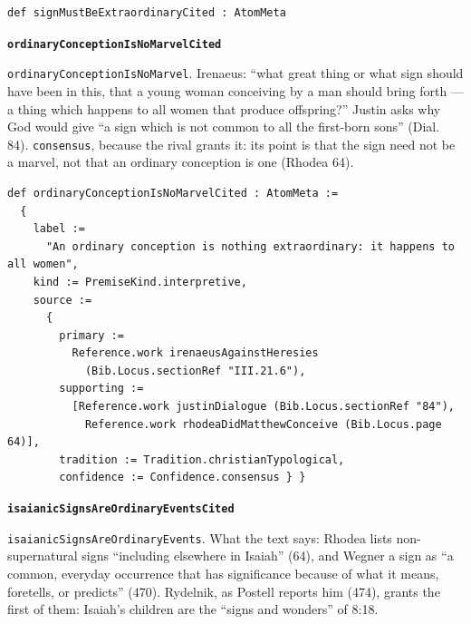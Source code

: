 \documentclass[11pt]{article}
\begin{document}
{\small\begin{verbatim}
def signMustBeExtraordinaryCited : AtomMeta
\end{verbatim}}
\par\medskip\noindent\textbf{\texttt{ordinary\allowbreak{}Conception\allowbreak{}Is\allowbreak{}No\allowbreak{}Marvel\allowbreak{}Cited}}\par\nobreak\noindent
\texttt{ordinary\allowbreak{}Conception\allowbreak{}Is\allowbreak{}No\allowbreak{}Marvel}. Irenaeus: “what great thing or what sign should have been in this, that a young woman conceiving by a man should bring forth — a thing which happens to all women that produce offspring?” Justin asks why God would give “a sign which is not common to all the first-born sons” (Dial. 84). \texttt{consensus}, because the rival grants it: its point is that the sign need not be a marvel, not that an ordinary conception is one (Rhodea 64).

{\small\begin{verbatim}
def ordinaryConceptionIsNoMarvelCited : AtomMeta :=
  {
    label :=
      "An ordinary conception is nothing extraordinary: it happens to all women",
    kind := PremiseKind.interpretive,
    source :=
      {
        primary :=
          Reference.work irenaeusAgainstHeresies
            (Bib.Locus.sectionRef "III.21.6"),
        supporting :=
          [Reference.work justinDialogue (Bib.Locus.sectionRef "84"),
            Reference.work rhodeaDidMatthewConceive (Bib.Locus.page 64)],
        tradition := Tradition.christianTypological,
        confidence := Confidence.consensus } }
\end{verbatim}}
\par\medskip\noindent\textbf{\texttt{isaianic\allowbreak{}Signs\allowbreak{}Are\allowbreak{}Ordinary\allowbreak{}Events\allowbreak{}Cited}}\par\nobreak\noindent
\texttt{isaianic\allowbreak{}Signs\allowbreak{}Are\allowbreak{}Ordinary\allowbreak{}Events}. What the text says: Rhodea lists non-supernatural signs “including elsewhere in Isaiah” (64), and Wegner a sign as “a common, everyday occurrence that has significance because of what it means, foretells, or predicts” (470). Rydelnik, as Postell reports him (474), grants the first of them: Isaiah’s children are the “signs and wonders” of 8:18.
\end{document}
